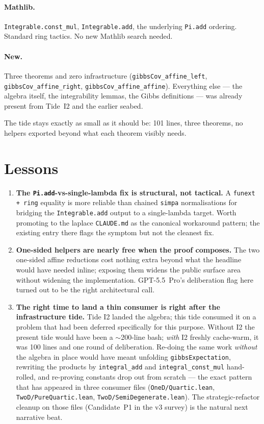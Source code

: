 \documentclass[11pt]{article}
\begin{document}
\paragraph{Mathlib.} \texttt{Integrable.const\_mul},
\texttt{Integrable.add}, the underlying \texttt{Pi.add} ordering. Standard
ring tactics. No new Mathlib search needed.

\paragraph{New.} Three theorems and zero infrastructure
(\texttt{gibbsCov\_affine\_left}, \texttt{gibbsCov\_affine\_right},
\texttt{gibbsCov\_affine\_affine}). Everything else --- the algebra
itself, the integrability lemmas, the Gibbs definitions --- was already
present from Tide~I2 and the earlier seabed.

The tide stays exactly as small as it should be: 101 lines, three
theorems, no helpers exported beyond what each theorem visibly needs.

\section{Lessons}

\begin{enumerate}[leftmargin=*]

\item \textbf{The \texttt{Pi.add}-vs-single-lambda fix is structural,
not tactical.} A \texttt{funext + ring} equality is more reliable than
chained \texttt{simpa} normalisations for bridging the
\texttt{Integrable.add} output to a single-lambda target. Worth promoting
to the laplace \texttt{CLAUDE.md} as the canonical workaround pattern;
the existing entry there flags the symptom but not the cleanest fix.

\item \textbf{One-sided helpers are nearly free when the proof
composes.} The two one-sided affine reductions cost nothing extra
beyond what the headline would have needed inline;
exposing them widens the public surface area without widening the
implementation. GPT-5.5~Pro's deliberation flag here turned out to be
the right architectural call.

\item \textbf{The right time to land a thin consumer is right after the
infrastructure tide.} Tide I2 landed the algebra; this tide consumed it
on a problem that had been deferred specifically for this purpose.
Without I2 the present tide would have been a $\sim$200-line bash;
\emph{with} I2 freshly cache-warm, it was 100 lines and one round of
deliberation. Re-doing the same work \emph{without} the algebra in
place would have meant unfolding \texttt{gibbsExpectation}, rewriting
the products by \texttt{integral\_add} and \texttt{integral\_const\_mul}
hand-rolled, and re-proving constants drop out from scratch --- the
exact pattern that has appeared in three consumer files
(\texttt{OneD/Quartic.lean}, \texttt{TwoD/PureQuartic.lean},
\texttt{TwoD/SemiDegenerate.lean}). The strategic-refactor cleanup on
those files (Candidate~P1 in the v3 survey) is the natural next
narrative beat.

\end{enumerate}
\end{document}
